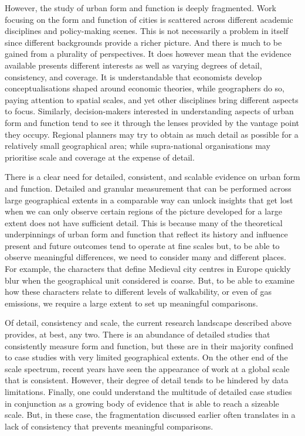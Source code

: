 However, the study of urban form and function is deeply fragmented.
Work focusing on the form and function of cities is scattered across
different academic disciplines and policy-making scenes. This is not
necessarily a problem in itself since different backgrounds
provide a richer picture. And there is much to be gained from a plurality of
perspectives.
%
It does however mean that the evidence available presents different
interests as well as varying degrees of detail, consistency, and coverage.
It is understandable that economists develop conceptualisations shaped around
economic theories, while geographers do so, paying attention to spatial scales,
and yet other disciplines bring different aspects to focus.
Similarly, decision-makers interested in understanding aspects of urban form
and function tend to see it through the lenses provided by the vantage point
they occupy. Regional planners may try to obtain as much detail as
possible for a relatively small geographical area; while supra-national
organisations may prioritise scale and coverage at the expense of detail.

There is a clear need for detailed, consistent, and scalable evidence on urban
form and function.
Detailed and granular measurement that can be performed across large
geographical extents in a comparable way can unlock insights that get lost
when we can only observe certain regions of the picture developed for a large
extent does not have sufficient detail.
%
This is because many of the
theoretical underpinnings of urban form and function that reflect its history
and influence present and future outcomes tend to operate at fine scales but,
to be able to observe meaningful differences, we need to consider many and
different places.
%
For example, the characters that define Medieval city centres in Europe
quickly blur when the geographical unit considered is coarse. But, to be able to
examine how these characters relate to different levels of walkability, or
even of gas emissions, we require a large extent to set up meaningful
comparisons.

Of detail, consistency and scale, the current research landscape described above
provides, at best, any two.
%
There is an abundance of detailed studies that consistently measure form and
function, but these are in their majority confined to case studies with very
limited geographical extents.
%
On the other end of the scale spectrum, recent years have seen the appearance
of work at a global scale that is consistent. However, their degree of detail
tends to be hindered by data limitations.
%
Finally, one could understand the multitude of detailed case studies in
conjunction as a growing body of evidence that is able to reach a sizeable
scale. But, in these case, the fragmentation discussed earlier often
translates in a lack of consistency that prevents meaningful comparisons.

